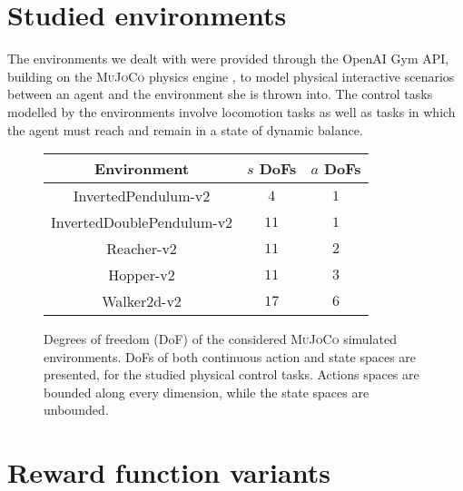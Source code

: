 

\section{Studied environments}
\label{studiedenvs}

The environments we dealt with were provided through the OpenAI Gym
\cite{Brockman2016-un} API, building on the \textsc{MuJoCo} physics engine
\cite{Todorov2012-gc}, to model physical interactive scenarios between
an agent and the environment she is thrown into.
The control tasks modelled by the environments involve locomotion tasks as
well as tasks in which the agent must reach and remain in a state of dynamic
balance.

\begin{figure}[!h]
  \centering
  \begin{tabular}{|ccc|}
    \hline
    Environment&$s$ DoFs&$a$ DoFs\\
    \hline
    InvertedPendulum-v2&$4$&$1$\\
    InvertedDoublePendulum-v2&$11$&$1$\\
    Reacher-v2&$11$&$2$\\
    Hopper-v2&$11$&$3$\\
    Walker2d-v2&$17$&$6$\\
    \hline
  \end{tabular}
  \caption{Degrees of freedom (DoF) of the considered \textsc{MuJoCo}
  simulated environments.
  DoFs of both continuous action and state spaces are presented, for the
  studied physical control tasks.
  Actions spaces are bounded along every dimension, while the state spaces are
  unbounded.}
  \label{envtablesam}
\end{figure}

\section{Reward function variants}

